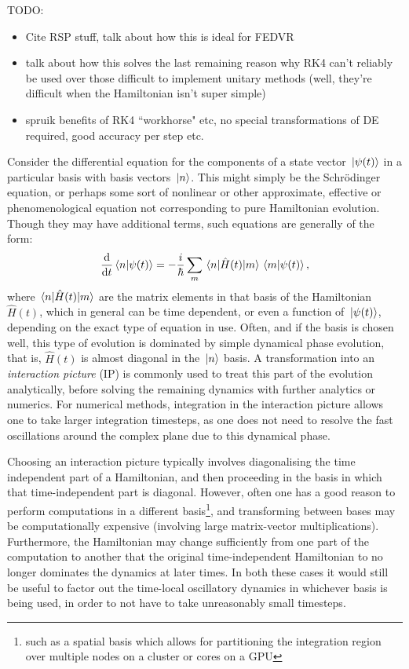 TODO:
\begin{itemize}
\item Cite RSP stuff, talk about how this is ideal for FEDVR
\item talk about how this solves the last remaining reason why RK4 can't reliably be used over those difficult to implement unitary methods (well, they're difficult when the Hamiltonian isn't super simple)
\item spruik benefits of RK4 ``workhorse" etc, no special transformations of DE required, good accuracy per step etc.
\end{itemize}

Consider the differential equation for the components of a state vector $\ket{\psi(t)}$ in a particular basis with basis vectors $\ket{n}$. This might simply be the Schrödinger equation, or perhaps some sort of nonlinear or other approximate, effective or phenomenological equation not corresponding to pure Hamiltonian evolution. Though they may have additional terms, such equations are generally of the form:
\begin{align}\label{eq:real_imag}
\dv t \braket{n}{\psi(t)} = -\frac i \hbar \sum_m \matrixel{n}{\hat H(t)}{m} \braket{m}{\psi(t)},
\end{align}
where $\matrixel{n}{\hat H(t)}{m}$ are the matrix elements in that basis of the Hamiltonian $\hat H(t)$, which in general can be time dependent, or even a function of $\ket{\psi(t)}$, depending on the exact type of equation in use. Often, and if the basis is chosen well, this type of evolution is dominated by simple dynamical phase evolution, that is, $\hat H(t)$ is almost diagonal in the $\ket{n}$ basis. A transformation into an \emph{interaction picture} (IP) is commonly used to treat this part of the evolution analytically, before solving the remaining dynamics with further analytics or numerics. For numerical methods, integration in the interaction picture allows one to take larger integration timesteps, as one does not need to resolve the fast oscillations around the complex plane due to this dynamical phase.

Choosing an interaction picture typically involves diagonalising the time independent part of a Hamiltonian, and then proceeding in the basis in which that time-independent part is diagonal. However, often one has a good reason to perform computations in a different basis\footnote{such as a spatial basis which allows for partitioning the integration region over multiple nodes on a cluster or cores on a GPU}, and transforming between bases may be computationally expensive (involving large matrix-vector multiplications). Furthermore, the Hamiltonian may change sufficiently from one part of the computation to another that the original time-independent Hamiltonian to no longer dominates the dynamics at later times. In both these cases it would still be useful to factor out the time-local oscillatory dynamics in whichever basis is being used, in order to not have to take unreasonably small timesteps.

